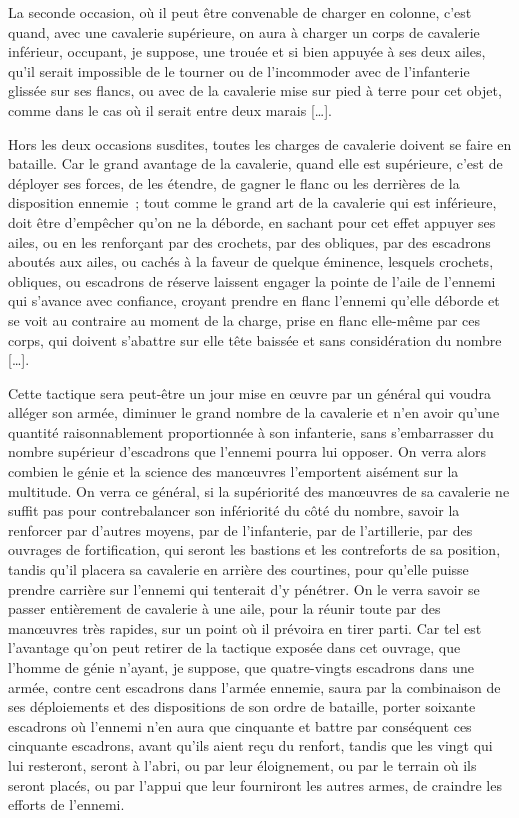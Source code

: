 \documentclass[french,twoside]{book} %
\begin{document}
La seconde occasion, où il peut être convenable de charger en colonne, c’est quand, avec une cavalerie supérieure, on aura à charger un corps de cavalerie inférieur, occupant, je suppose, une trouée et si bien appuyée à ses deux ailes, qu’il serait impossible de le tourner ou de l’incommoder avec de l’infanterie glissée sur ses flancs, ou avec de la cavalerie mise sur pied à terre pour cet objet, comme dans le cas où il serait entre deux marais […].\par
Hors les deux occasions susdites, toutes les charges de cavalerie doivent se faire en bataille. Car le grand avantage de la cavalerie, quand elle est supérieure, c’est de déployer ses forces, de les étendre, de gagner le flanc ou les derrières de la disposition ennemie ; tout comme le grand art de la cavalerie qui est inférieure, doit être d’empêcher qu’on ne la déborde, en sachant pour cet effet appuyer ses ailes, ou en les renforçant par des crochets, par des obliques, par des escadrons aboutés aux ailes, ou cachés à la faveur de quelque éminence, lesquels crochets, obliques, ou escadrons de réserve laissent engager la pointe de l’aile de l’ennemi qui s’avance avec confiance, croyant prendre en flanc l’ennemi qu’elle déborde et se voit au contraire au moment de la charge, prise en flanc elle-même par ces corps, qui doivent s’abattre sur elle tête baissée et sans considération du nombre […].\par
Cette tactique sera peut-être un jour mise en œuvre par un général qui voudra alléger son armée, diminuer le grand nombre de la cavalerie et n’en avoir qu’une quantité raisonnablement proportionnée à son infanterie, sans s’embarrasser du nombre supérieur d’escadrons que l’ennemi pourra lui opposer. On verra alors combien le génie et la science des manœuvres l’emportent aisément sur la multitude. On verra ce général, si la supériorité des manœuvres de sa cavalerie ne suffit pas pour contrebalancer son infériorité du côté du nombre, savoir la renforcer par d’autres moyens, par de l’infanterie, par de l’artillerie, par des ouvrages de fortification, qui seront les bastions et les contreforts de sa position, tandis qu’il placera sa cavalerie en arrière des courtines, pour qu’elle puisse prendre carrière sur l’ennemi qui tenterait d’y pénétrer. On le verra savoir se passer entièrement de cavalerie à une aile, pour la réunir toute par des manœuvres très rapides, sur un point où il prévoira en tirer parti. Car tel est l’avantage qu’on peut retirer de la tactique exposée dans cet ouvrage, que l’homme de génie n’ayant, je suppose, que quatre-vingts escadrons dans une armée, contre cent escadrons dans l’armée ennemie, saura par la combinaison de ses déploiements et des dispositions de son ordre de bataille, porter soixante escadrons où l’ennemi n’en aura que cinquante et battre par conséquent ces cinquante escadrons, avant qu’ils aient reçu du renfort, tandis que les vingt qui lui resteront, seront à l’abri, ou par leur éloignement, ou par le terrain où ils seront placés, ou par l’appui que leur fourniront les autres armes, de craindre les efforts de l’ennemi.\par
\end{document}
